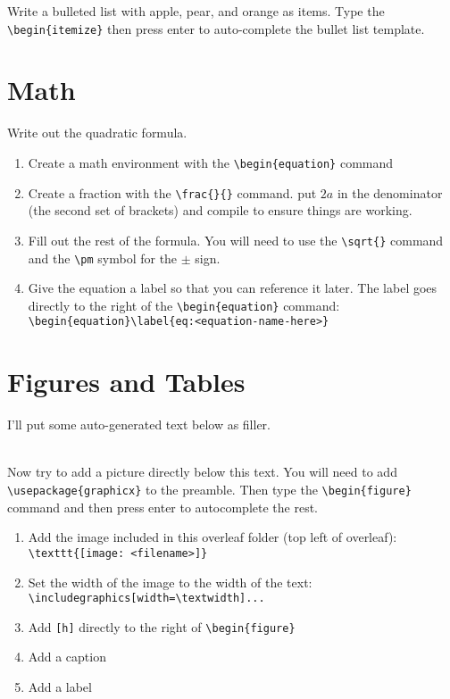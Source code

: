         Write a bulleted list with apple, pear, and orange as items. Type the \verb"\begin{itemize}" then press enter to auto-complete the bullet list template.


    \section{Math}
        Write out the quadratic formula.
        \begin{enumerate}
            \item Create a math environment with the \verb"\begin{equation}" command
            \item Create a fraction with the \verb"\frac{}{}" command. put $2a$ in the denominator (the second set of brackets) and compile to ensure things are working.
            \item Fill out the rest of the formula. You will need to use the \verb"\sqrt{}" command and the \verb"\pm" symbol for the $\pm$ sign.
            \item Give the equation a label so that you can reference it later. The label goes directly to the right of the \verb"\begin{equation}" command: \verb"\begin{equation}\label{eq:<equation-name-here>}"
        \end{enumerate}





    \section{Figures and Tables}
        I'll put some auto-generated text below as filler.

        \lipsum[1]\\

        Now try to add a picture directly below this text. You will need to add \verb"\usepackage{graphicx}" to the preamble. Then type the \verb"\begin{figure}" command and then press enter to autocomplete the rest.

        \begin{enumerate}
            \item Add the image included in this overleaf folder (top left of overleaf): \verb"\texttt{[image: <filename>]}"
            \item Set the width of the image to the width of the text:\\    \verb"\includegraphics[width=\textwidth]..."
            \item Add \verb"[h]" directly to the right of \verb"\begin{figure}"
            \item Add a caption
            \item Add a label
        \end{enumerate}

